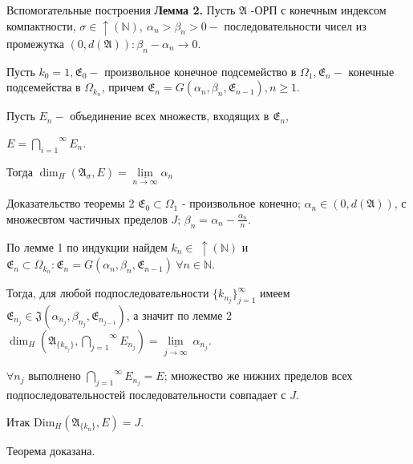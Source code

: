 \documentclass{beamer}
\begin{document}
% 
\begin{frame}{Вспомогательные построения}
    \textbf{Лемма 2.} Пусть $\mathfrak{A}$ -ОРП с конечным
    индексом компактности,
    $\sigma  \in \uparrow (\mathbb{N}), \ \alpha_n > \beta_n > 0 - $
    последовательности чисел из промежутка $(0, d(\mathfrak{A}) ) : 
    \beta_n - \alpha_n \to 0$.
    
    Пусть $k_0 = 1, \mathfrak{E}_{0} - $
    произвольное конечное подсемейство в $\Omega_1, 
    \mathfrak{E}_{n} - $
    конечные подсемейства в $\Omega_{k_n}$,
    причем $\mathfrak{E}_n = 
    G(\alpha_n, \beta_n, \mathfrak{E}_{n-1}), n \geq 1$.
    
    Пусть $E_n - $ объединение всех множеств,
    входящих в $\mathfrak{E}_n$,
    
    $ E = 
    \overset{\infty}{\underset{i=1}{\bigcap}}
    E_n$.
    \newline
    
    Тогда 
    $\dim_H (\mathfrak{A}_\sigma, E)=
    \underset{n \to \infty}{\underline{\lim}}\alpha_n$
\end{frame}

\begin{frame}{Доказательство теоремы 2}
    $\mathfrak{E}_0 \subset \Omega_1$ - произвольное конечно;
    $\alpha_n \in (0, d( \mathfrak{A} )) $, 
    с множесвтом частичных пределов $J$;
    $\beta_n = \alpha_n - \frac{\alpha_n}{n}$.
    
    По лемме 1 по индукции найдем 
    $k_n \in \  \uparrow(\mathbb{N})$ и
    $\mathfrak{E}_n \subset \Omega_{k_n} : \mathfrak{E}_n =
    G(\alpha_n, \beta_n, \mathfrak{E}_{n-1}) \ \forall n \in \mathbb{N}$.
    
    Тогда, для любой подпоследовательности
    $\{ k_{n_j} \}_{j = 1}^\infty$ имеем
    $\mathfrak{E}_{n_j} \in
    \mathfrak{J} (\alpha_{n_j}, \beta_{n_j}, \mathfrak{E}_{n_{j - 1}})$,
    а значит по лемме 2
    $\dim_H(  \mathfrak{A}_{\{ k_{n_j} \}},
    \overset{\infty}{
        \underset{j = 1}{
            \bigcap
        }
    }
    E_{n_j}
    ) =
    \underset{j \to \infty}{\underline{\lim}} \ \alpha_{n_j}
    $.
    
    $\forall n_j$ выполнено
    $
    \overset{\infty}{
        \underset{j = 1}{
            \bigcap
        }
    }
    E_{n_j} = E
    $;
    множество же нижних пределов всех
    подпоследовательностей последовательности
    совпадает с $J$.

    Итак
    $\mbox{Dim}_H 
    (\mathfrak{A}_{\{ k_{n} \}} , E) =
    J$.
    
    Теорема доказана.
\end{frame}
\end{document}
